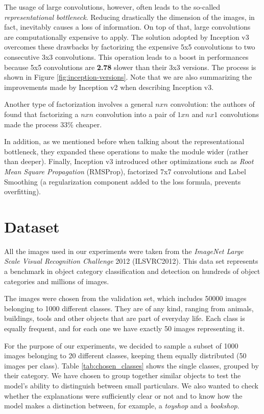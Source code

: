 \documentclass[12pt, twoside, a4paper]{report}
\begin{document}
The usage of large convolutions, however, often leads to the so-called \textit{representational bottleneck}. Reducing drastically the dimension of the images, in fact, inevitably causes a loss of information. On top of that, large convolutions are computationally expensive to apply. The solution adopted by Inception v3 overcomes these drawbacks by factorizing the expensive 5x5 convolutions to two consecutive 3x3 convolutions. This operation leads to a boost in performances because 5x5 convolutions are \textbf{2.78} slower than their 3x3 versions. The process is shown in Figure \ref{fig:inception-versions}. Note that we are also summarizing the improvements made by Inception v2 when describing Inception v3.

Another type of factorization involves a general $nxn$ convolution: the authors of \cite{inception-v3} found that factorizing a $nxn$ convolution into a pair of $1xn$ and $nx1$ convolutions made the process 33\% cheaper. 

In addition, as we mentioned before when talking about the representational bottleneck, they expanded these operations to make the module wider (rather than deeper). 
Finally, Inception v3 introduced other optimizations such as \textit{Root Mean Square Propagation} (RMSProp), factorized 7x7 convolutions and Label Smoothing (a regularization component added to the loss formula, prevents overfitting).

\section{Dataset} \label{sect:dataset_used}

All the images used in our experiments were taken from the \textit{ImageNet Large Scale Visual Recognition Challenge} 2012 (ILSVRC2012)\cite{ilsvrc}. This data set represents a benchmark in object category classification and detection on hundreds of object categories and millions of images. 

The images were chosen from the validation set, which includes 50000 images belonging to 1000 different classes. They are of any kind, ranging from animals, buildings, tools and other objects that are part of everyday life. Each class is equally frequent, and for each one we have exactly 50 images representing it.

For the purpose of our experiments, we decided to sample a subset of 1000 images belonging to 20 different classes, keeping them equally distributed (50 images per class). Table \ref{tab:chosen_classes} shows the single classes, grouped by their category. We have chosen to group together similar objects to test the model's ability to distinguish between small particulars. We also wanted to check whether the explanations were sufficiently clear or not and to know how the model makes a distinction between, for example, a \textit{toyshop} and a \textit{bookshop}.
\end{document}
